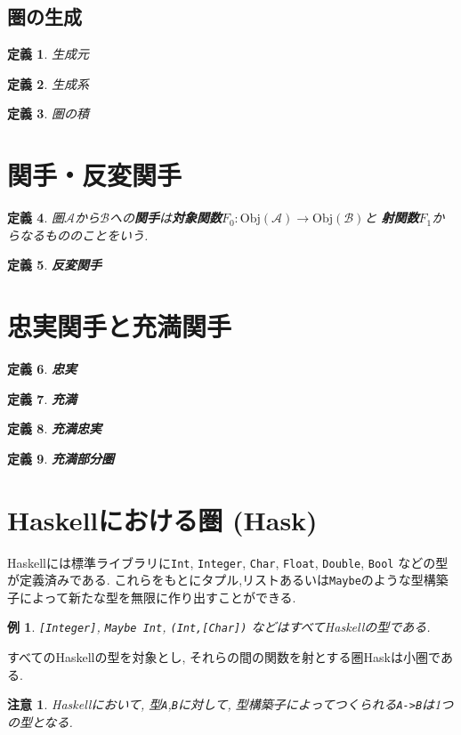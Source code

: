 \documentclass{jsbook}
\theoremstyle{plain}
\newtheorem{Def}{定義}[chapter]
\newtheorem{caution}{注意}[chapter]
\newtheorem{example}{例}[chapter]
\begin{document}
\subsection{圏の生成}
\begin{Def}
生成元
\end{Def}
\begin{Def}
生成系
\end{Def}
\begin{Def}
圏の積
\end{Def}
\section{関手・反変関手}
\begin{Def}
圏$\mathscr{A}$から$\mathscr{B}$への{\bf 関手}は{\bf 対象関数}$F_0:\mathrm{Obj}(\mathscr{A})\rightarrow\mathrm{Obj}(\mathscr{B})$と
{\bf 射関数}$F_1$からなるもののことをいう.
\end{Def}
\begin{Def}
{\bf 反変関手}
\end{Def}

\section{忠実関手と充満関手}
\begin{Def}
{\bf 忠実}
\end{Def}
\begin{Def}
{\bf 充満}
\end{Def}
\begin{Def}
{\bf 充満忠実}
\end{Def}
\begin{Def}
{\bf 充満部分圏}
\end{Def}
\section{Haskellにおける圏 (Hask)}
Haskellには標準ライブラリに\verb|Int|, \verb|Integer|, 
\verb|Char|,
\verb|Float|,
\verb|Double|,
\verb|Bool|
などの型が定義済みである.
これらをもとにタプル,リストあるいは\verb|Maybe|のような型構築子によって新たな型を無限に作り出すことができる.
\begin{example}
\verb|[Integer]|, \verb|Maybe Int|,
\verb|(Int,[Char])| などはすべてHaskellの型である.
\end{example}

すべてのHaskellの型を対象とし, それらの間の関数を射とする圏Haskは小圏である.
\begin{caution}
Haskellにおいて, 型\verb|A|,\verb|B|に対して, 型構築子によってつくられる\verb|A->B|は1つの型となる.
\end{caution}
\end{document}
